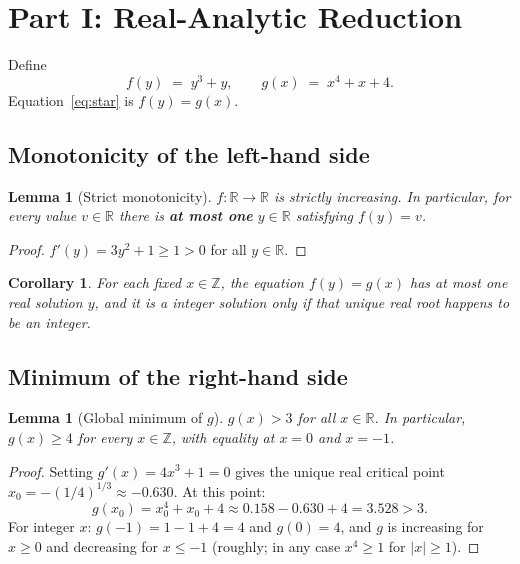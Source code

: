 \documentclass[12pt, a4paper]{article}
\newtheorem{lemma}[theorem]{Lemma}
\newtheorem{corollary}[theorem]{Corollary}
\theoremstyle{definition}
\newcommand{\Z}{\mathbb{Z}}
\newcommand{\R}{\mathbb{R}}
\begin{document}
\section{Part I: Real-Analytic Reduction}\label{sec:real}

\noindent
Define
\[
  f(y) \;=\; y^3 + y, \qquad g(x) \;=\; x^4 + x + 4.
\]
Equation~\eqref{eq:star} is $f(y) = g(x)$.

\subsection{Monotonicity of the left-hand side}

\begin{lemma}[Strict monotonicity]\label{lem:mono}
  $f : \R \to \R$ is strictly increasing.  In particular, for every value
  $v \in \R$ there is \textbf{at most one} $y \in \R$ satisfying $f(y) = v$.
\end{lemma}

\begin{proof}
  $f'(y) = 3y^2 + 1 \geq 1 > 0$ for all $y \in \R$.
\end{proof}

\begin{corollary}\label{cor:unique_y}
  For each fixed $x \in \Z$, the equation $f(y) = g(x)$ has at most one
  \emph{real} solution $y$, and it is a integer solution only if that unique
  real root happens to be an integer.
\end{corollary}

\subsection{Minimum of the right-hand side}

\begin{lemma}[Global minimum of $g$]\label{lem:gmin}
  $g(x) > 3$ for all $x \in \R$.  In particular, $g(x) \geq 4$ for every $x \in \Z$,
  with equality at $x = 0$ and $x = -1$.
\end{lemma}

\begin{proof}
  Setting $g'(x) = 4x^3 + 1 = 0$ gives the unique real critical point
  $x_0 = -(1/4)^{1/3} \approx -0.630$.  At this point:
  \[
    g(x_0) = x_0^4 + x_0 + 4 \approx 0.158 - 0.630 + 4 = 3.528 > 3.
  \]
  For integer $x$: $g(-1) = 1 - 1 + 4 = 4$ and $g(0) = 4$, and $g$ is
  increasing for $x \geq 0$ and decreasing for $x \leq -1$
  (roughly; in any case $x^4 \geq 1$ for $|x| \geq 1$).
\end{proof}
\end{document}
